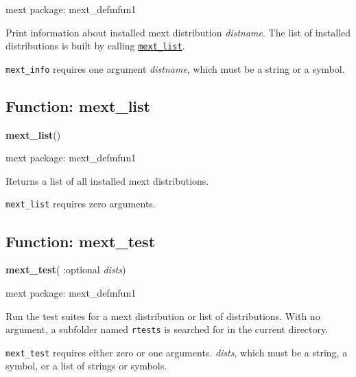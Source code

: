 \documentclass[]{article}
\begin{document}
\noindent mext package: mext\_defmfun1



\vspace{5 pt}
Print information about installed mext distribution {\it distname}. The list of installed distributions is built by calling \hyperlink{mext_list}{{\tt mext\_list}}. 

\vspace{5 pt}

   {\tt mext\_info} requires one argument {\it distname}, which must be a string or a symbol.


\vspace{5 pt}


\subsection{Function: mext\_list\label{sec:mext_list}}
\hypertarget{mext_list}{}
{\bf mext\_list}()


\noindent mext package: mext\_defmfun1



\vspace{5 pt}
Returns a list of all installed mext distributions. 

\vspace{5 pt}

   {\tt mext\_list} requires zero arguments.


\vspace{5 pt}


\subsection{Function: mext\_test\label{sec:mext_test}}
\hypertarget{mext_test}{}
{\bf mext\_test}( :optional {\it dists})


\noindent mext package: mext\_defmfun1



\vspace{5 pt}
Run the test suites for a mext distribution or list of distributions. With no argument, a subfolder named \verb#rtests# is searched for in the current directory. 

\vspace{5 pt}

   {\tt mext\_test} requires either zero or one arguments.
 {\it dists}, which must be  a string, a symbol, or a list of strings or symbols.
\end{document}
